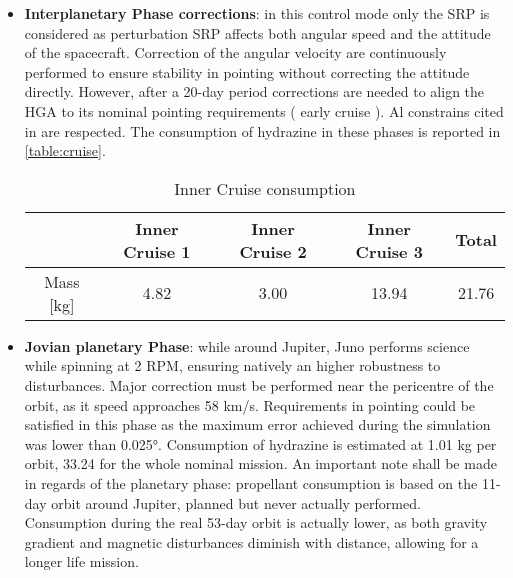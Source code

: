 \begin{itemize}
    \item \textbf{Interplanetary Phase corrections}: in this control mode only the SRP is considered as perturbation SRP affects both angular speed and the attitude of the spacecraft. Correction of the angular velocity are continuously performed to ensure stability in pointing without correcting the attitude directly. However, after a 20-day period corrections are needed to align the HGA to its nominal pointing requirements \mref ( early cruise ). Al constrains cited in \mref are respected. 
    The consumption of hydrazine in these phases is reported in \autoref{table:cruise}.

    \begin{table}[H]
        \renewcommand{\arraystretch}{1.3}
        \centering
        \begin{tabular}{|c|c|c|c|c|}
            \hline
            &\textbf{Inner Cruise 1} &\textbf{Inner Cruise 2} & \textbf{Inner Cruise 3} &\textbf{Total}\\
            \hline
            \hline
            Mass [kg] & 4.82 & 3.00 & 13.94 & 21.76 \\
            \hline
        \end{tabular}
        \caption{Inner Cruise consumption}
        \label{table:cruise}
    \end{table}

    \item \textbf{Jovian planetary Phase}: while around Jupiter, Juno performs science while spinning at 2 RPM, ensuring natively an higher robustness to disturbances. Major correction must be performed near the pericentre of the orbit, as it speed approaches 58 km/s.  
    Requirements in pointing could be satisfied in this phase as the maximum error achieved during the simulation was lower than 0.025°.  Consumption of hydrazine is estimated at 1.01 kg per orbit, 33.24 for the whole nominal mission.
    An important note shall be made in regards of the planetary phase: propellant consumption is based on the 11-day orbit around Jupiter, planned but never actually performed. Consumption during the real 53-day orbit is actually lower, as both gravity gradient and magnetic disturbances diminish with distance, allowing for a longer life mission. 
    
\end{itemize}
